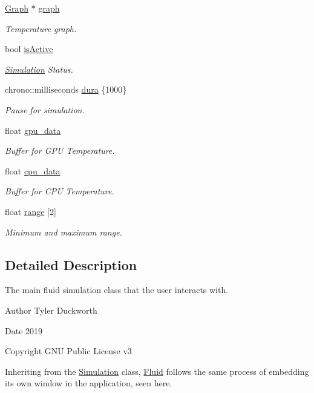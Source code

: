\begin{DoxyCompactItemize}
\mbox{\hyperlink{classGraph}{Graph}} $\ast$ \mbox{\hyperlink{classSmoke_a7a2faa3ba32e51c7eb4212622f31ed79}{graph}}
\begin{DoxyCompactList}\small\item\em Temperature graph. \end{DoxyCompactList}\item 
bool \mbox{\hyperlink{classSmoke_a83c338b4ec7a3d71443e8f1fd9d7a1b5}{is\+Active}}
\begin{DoxyCompactList}\small\item\em \mbox{\hyperlink{classSimulation}{Simulation}} Status. \end{DoxyCompactList}\item 
chrono\+::milliseconds \mbox{\hyperlink{classSmoke_ae62660aa3919c7a01b5a0c3ad5ec1715}{dura}} \{1000\}
\begin{DoxyCompactList}\small\item\em Pause for simulation. \end{DoxyCompactList}\item 
float \mbox{\hyperlink{classSmoke_afcd49fb97c3573ec4c779346d4be1c95}{gpu\+\_\+data}}
\begin{DoxyCompactList}\small\item\em Buffer for G\+PU Temperature. \end{DoxyCompactList}\item 
float \mbox{\hyperlink{classSmoke_a27ecb4dc9f91a34bed0637c1743275cb}{cpu\+\_\+data}}
\begin{DoxyCompactList}\small\item\em Buffer for C\+PU Temperature. \end{DoxyCompactList}\item 
float \mbox{\hyperlink{classSmoke_ae27bb310eec891bf0973a263383563a5}{range}} \mbox{[}2\mbox{]}
\begin{DoxyCompactList}\small\item\em Minimum and maximum range. \end{DoxyCompactList}\end{DoxyCompactItemize}


\subsection{Detailed Description}
The main fluid simulation class that the user interacts with. 

\begin{DoxyAuthor}{Author}
Tyler Duckworth 
\end{DoxyAuthor}
\begin{DoxyDate}{Date}
2019 
\end{DoxyDate}
\begin{DoxyCopyright}{Copyright}
G\+NU Public License v3
\end{DoxyCopyright}
Inheriting from the \mbox{\hyperlink{classSimulation}{Simulation}} class, \mbox{\hyperlink{classFluid}{Fluid}} follows the same process of embedding its own window in the application, seen here.

